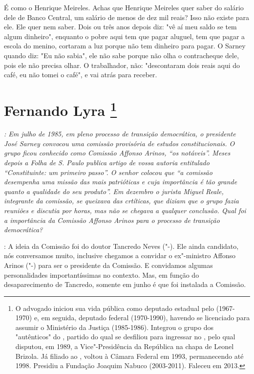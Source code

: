 É como o Henrique Meireles. Achas que Henrique Meireles quer saber do
salário dele de Banco Central, um salário de menos de dez mil reais?
Isso não existe para ele. Ele quer nem saber. Dois ou três anos depois
diz: "vê aí meu saldo se tem algum dinheiro", enquanto o pobre aqui tem
que pagar aluguel, tem que pagar a escola do menino, cortaram a luz
porque não tem dinheiro para pagar. O Sarney quando diz: "Eu não sabia",
ele não sabe porque não olha o contracheque dele, pois ele não precisa
olhar. O trabalhador, não: "descontaram dois reais aqui do café, eu não
tomei o café", e vai atrás para receber.

\chapter{Fernando Lyra
\footnote{O advogado iniciou sua vida pública como deputado estadual pelo 
(1967-1970) e, em seguida, deputado federal (1970-1990), havendo se
licenciado para assumir o Ministério da Justiça (1985-1986). Integrou o
grupo dos "autênticos" do , partido do qual se desfiliou para
ingressar no , pelo qual disputou, em 1989, a Vice"-Presidência da
República na chapa de Leonel Brizola. Já filiado ao , voltou à Câmara
Federal em 1993, permanecendo até 1998. Presidiu a Fundação Joaquim
Nabuco (2003-2011). Faleceu em 2013.}}

\emph{: Em julho de 1985, em pleno processo de transição democrática, o
presidente José Sarney convocou uma comissão provisória de estudos
constitucionais. O grupo ficou conhecido como Comissão Affonso Arinos,
``os notáveis''. Meses depois a Folha de S. Paulo publica artigo de
vossa autoria entitulado ``Constituinte: um primeiro passo''. O senhor
colocou que ``a comissão desempenha uma missão das mais patrióticas e
cuja importância é tão grande quanto a qualidade do seu produto''. Em
dezembro o jurista Miguel Reale, integrante da comissão, se queixava das
crtíticas, que diziam que o grupo fazia reuniões e discutia por horas,
mas não se chegava a qualquer conclusão. Qual foi a importância da
Comissão Affonso Arinos para o processo de transição democrática?}

: A ideia da Comissão foi do doutor Tancredo Neves
("-). Ele ainda candidato, nós conversamos muito, inclusive
chegamos a convidar o ex"-ministro Affonso Arinos ("-) para ser o
presidente da Comissão. E convidamos algumas personalidades
importantíssimas no contexto. Mas, em função do desaparecimento de
Tancredo, somente em junho é que foi instalada a Comissão.


